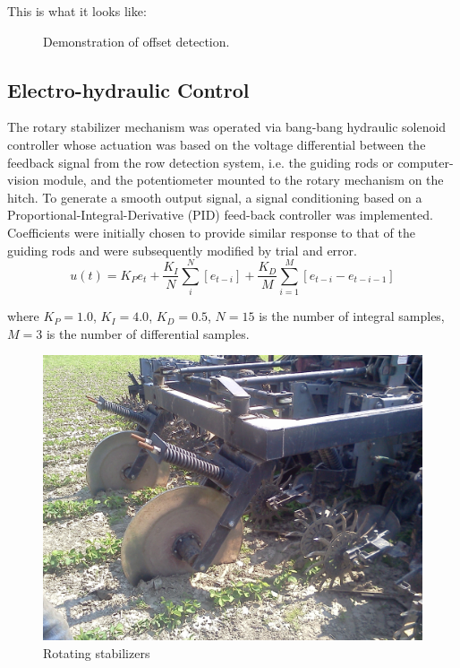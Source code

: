 \documentclass[authoryear]{elsarticle}
\begin{document}
This is what it looks like:

\begin{figure}
  \centering
  \caption{Demonstration of offset detection.}
  \label{fig:row_estimation}
\end{figure}

\subsection{Electro-hydraulic Control}
The rotary stabilizer mechanism was operated via bang-bang hydraulic
solenoid controller whose actuation was based on the voltage
differential between the feedback signal from the row detection
system, i.e. the guiding rods or computer-vision module, and the
potentiometer mounted to the rotary mechanism on the hitch. 
To generate a smooth output signal, a signal conditioning based on a
Proportional-Integral-Derivative (PID) feed-back controller was
implemented. Coefficients were initially chosen to provide similar
response to that of the guiding rods and were subsequently modified by
trial and error.
\begin{equation}
    u(t) = K_{P}e_{t} + \frac{K_{I}}{N}\displaystyle\sum_i^N \left[
      e_{t-i} \right] +
    \frac{K_{D}}{M}\displaystyle\sum_{i=1}^M \left[e_{t-i}-e_{t-i-1}\right]
  \label{eq:pid}
\end{equation}
\begin{flushleft}
where $K_{P}=1.0$, $K_{I}=4.0$, $K_{D}=0.5$, $N=15$ is the number of integral samples,
$M=3$ is the number of differential samples.
\end{flushleft}

\begin{figure}
  \centering
  \includegraphics[scale=0.1,natwidth=610,natheight=642]{stabilizers.jpg}
  \caption{Rotating stabilizers}
  \label{fig:stabilizers}
\end{figure}
\end{document}
